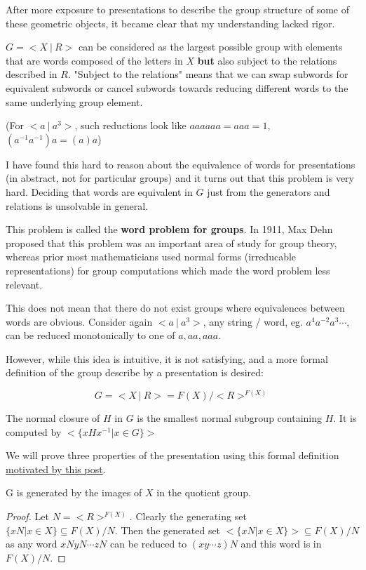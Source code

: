 \documentclass[10pt]{article}
\begin{document}
\begin{definition}
\begin{definition}
After more exposure to presentations to describe the group structure of some of
these geometric objects, it became clear that my understanding lacked rigor.

$G = <X~|~R>$ can be considered as the largest possible group with elements
that are words composed of the letters in $X$ \textbf{but} also subject to the
relations described in $R$. "Subject to the relations" means that we can swap
subwords for equivalent subwords or cancel subwords towards reducing different
words to the same underlying group element. 

(For $<a ~|~a^3>$, such reductions look like $aaaaaa = aaa = 1$, $(a^{-1}a^{-1})a = (a)a$)

I have found this hard to reason about the equivalence of words for
presentations (in abstract, not for particular groups) and it turns out that
this problem is very hard. Deciding that words are equivalent in $G$ just from
the generators and relations is unsolvable in general.

\begin{note}
	This problem is called the \textbf{word problem for groups}. In 1911, Max
	Dehn proposed that this problem was an important area of study for group
	theory, whereas prior most mathematicians used normal forms (irreducable
	representations) for group computations which made the word problem less
	relevant.
\end{note}

This does not mean that there do not exist groups where equivalences between
words are obvious. Consider again $<a ~|~a^3>$, any string / word, eg.
$a^4a^{-2}a^3\cdots$, can be reduced monotonically to one of $a, aa, aaa$. 

However, while this idea is intuitive, it is not satisfying, and a more formal
definition of the group describe by a presentation is desired:

\[ G = <X~|~R> = F(X) / <R>^{F(X)} \]

\begin{definition}
	The normal closure of $H$ in $G$ is the smallest normal subgroup containing
	$H$. It is computed by $< \{ xHx^{-1} | x \in G \} >$
\end{definition}

We will prove three properties of the presentation using this formal definition
\href{https://math.stackexchange.com/a/695061/1276086}{motivated by this post}.

\begin{proposition}
	G is generated by the images of $X$ in the quotient group.
\end{proposition}
\begin{proof}
Let $N = <R>^{F(X)}$. Clearly the generating set $\{ xN | x \in X \} \subseteq F(X) / N$. Then the
generated set $< \{ xN | x \in X \} > \subseteq F(X) / N$ as any word
$xNyN \cdots zN$ can be reduced to $(xy \cdots z)N$ and this word is in
$F(X) / N$.


\end{proof}
\end{definition}
\end{definition}
\end{document}

